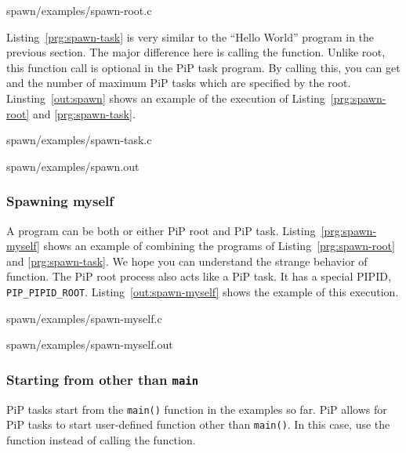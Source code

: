  {spawn/examples/spawn-root.c}

Listing~\ref{prg:spawn-task} is very similar to the ``Hello World''
program in the previous section. The major difference here is calling
the  function. Unlike root, this function call is
optional in the PiP task program. By calling this, you can get 
{\PIPID} and the number of maximum PiP tasks which are specified by the
root. Linsting~\ref{out:spawn} shows an example of the execution of
Listing~\ref{prg:spawn-root} and \ref{prg:spawn-task}. 


                {spawn/examples/spawn-task.c}


                {spawn/examples/spawn.out}

\subsubsection{Spawning myself}

A program can be both or either PiP root and PiP
task. Listing~\ref{prg:spawn-myself} shows an example of combining the
programs of Listing~\ref{prg:spawn-root} and \ref{prg:spawn-task}. We
hope you can understand the strange behavior of 
function. The PiP root process also acts like a PiP task. It has a
special PIPID, {\tt PIP_PIPID_ROOT}. 
Listing~\ref{out:spawn-myself} shows the example of this
execution. 


                {spawn/examples/spawn-myself.c}


                {spawn/examples/spawn-myself.out}

\subsubsection{Starting from other than {\tt main}}

PiP tasks start from the {\tt main()} function in the examples so
far. PiP allows for PiP tasks to start user-defined function other
than {\tt main()}. In this case, use the 
function instead of calling the  function.

